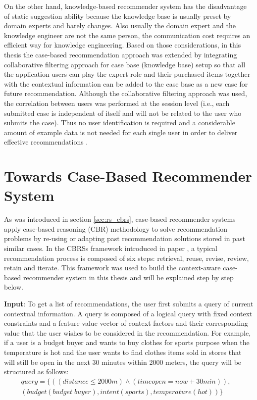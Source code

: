 On the other hand, knowledge-based recommender system has the disadvantage of static suggestion ability because the knowledge base is usually preset by domain experts and barely changes. Also usually the domain expert and the knowledge engineer are not the same person, the communication cost requires an efficient way for knowledge engineering. Based on those considerations, in this thesis the case-based recommendation approach was extended by integrating collaborative filtering approach for case base (knowledge base) setup so that all the application users can play the expert role and their purchased items together with the contextual information can be added to the case base as a new case for future recommendation. Although the collaborative filtering approach was used, the correlation between users was performed at the session level (i.e., each submitted case is independent of itself and will not be related to the user who submits the case). Thus no user identification is required and a considerable amount of example data is not needed for each single user in order to deliver effective recommendations \cite{ref:26}.

\section{Towards Case-Based Recommender System} \label{sec:tcbrs}

As was introduced in section \ref{sec:rs_cbrs}, case-based recommender systems apply case-based reasoning (CBR) methodology to solve recommendation problems by re-using or adapting past recommendation solutions stored in past similar cases. In the CBRSs framework introduced in paper \cite{ref:22}, a typical recommendation process is composed of six steps: retrieval, reuse, revise, review, retain and iterate. This framework was used to build the context-aware case-based recommender system in this thesis and will be explained step by step below.

\textbf{Input}: To get a list of recommendations, the user first submits a query of current contextual information. A query is composed of a logical query with fixed context constraints and a feature value vector of context factors and their corresponding value that the user wishes to be considered in the recommendation. For example, if a user is a budget buyer and wants to buy clothes for sports purpose when the temperature is hot and the user wants to find clothes items sold in stores that will still be open in the next 30 minutes within 2000 meters, the query will be structured as follows:
\begin{equation} \label{eq:query}
\begin{split}
	query =  \{((distance \leq 2000m)\wedge(timeopen = now+30min)), &\\
	              (budget (budget\; buyer), intent (sports), temperature (hot))\} &
\end{split}
\end{equation}


